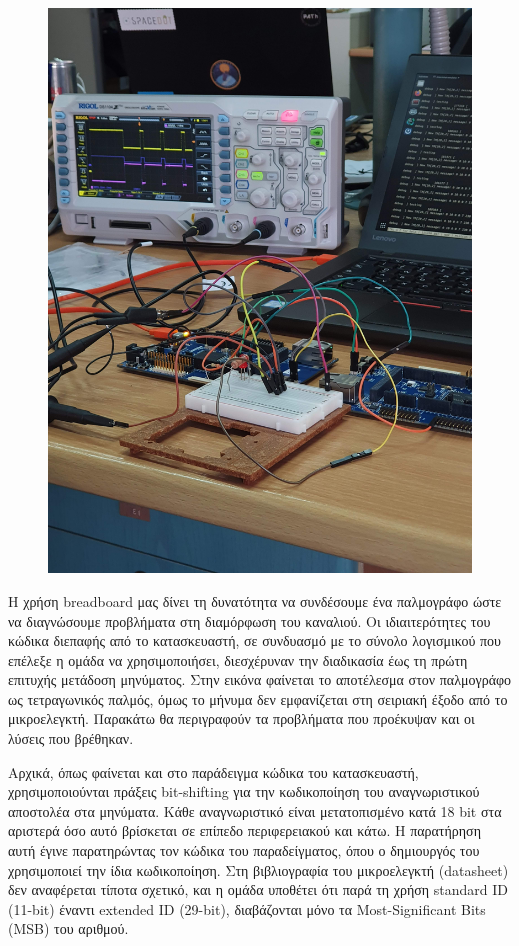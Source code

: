 \documentclass[a4paper,nobib,justified]{tufte-book}
\begin{document}
\begin{figure}[h]
	\includegraphics[angle=270,origin=c]{media/images/lab-wiring-scope.jpg}
\end{figure}

Η χρήση breadboard μας δίνει τη δυνατότητα να συνδέσουμε ένα παλμογράφο ώστε να διαγνώσουμε προβλήματα στη διαμόρφωση του καναλιού. Οι ιδιαιτερότητες του κώδικα διεπαφής από το κατασκευαστή, σε συνδυασμό με το σύνολο λογισμικού που επέλεξε η ομάδα να χρησιμοποιήσει, διεσχέρυναν την διαδικασία έως τη πρώτη επιτυχής μετάδοση μηνύματος. Στην εικόνα φαίνεται το αποτέλεσμα στον παλμογράφο ως τετραγωνικός παλμός, όμως το μήνυμα δεν εμφανίζεται στη σειριακή έξοδο από το μικροελεγκτή. Παρακάτω θα περιγραφούν τα προβλήματα που προέκυψαν και οι λύσεις που βρέθηκαν.

Αρχικά, όπως φαίνεται και στο παράδειγμα κώδικα του κατασκευαστή, χρησιμοποιούνται πράξεις bit-shifting για την κωδικοποίηση του αναγνωριστικού αποστολέα στα μηνύματα. Κάθε αναγνωριστικό είναι μετατοπισμένο κατά 18 bit στα αριστερά όσο αυτό βρίσκεται σε επίπεδο περιφερειακού και κάτω. Η παρατήρηση αυτή έγινε παρατηρώντας τον κώδικα του παραδείγματος, όπου ο δημιουργός του χρησιμοποιεί την ίδια κωδικοποίηση. Στη βιβλιογραφία του μικροελεγκτή (datasheet) δεν αναφέρεται τίποτα σχετικό, και η ομάδα υποθέτει ότι παρά τη χρήση standard ID (11-bit) έναντι extended ID (29-bit), διαβάζονται μόνο τα Most-Significant Bits (MSB) του αριθμού. 
\end{document}
